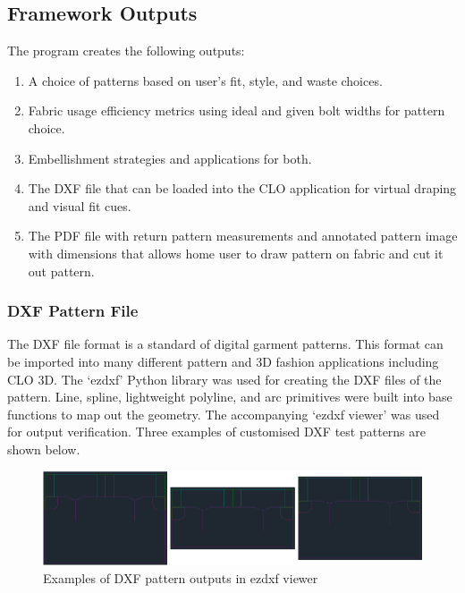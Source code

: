 
\subsection{Framework Outputs}
The program creates the following outputs:
\begin{enumerate}
    \item A choice of patterns based on user's fit, style, and waste choices.
    \item Fabric usage efficiency metrics using ideal and given bolt widths for pattern choice.
    \item Embellishment strategies and applications for both.
    \item The DXF file that can be loaded into the CLO application for virtual draping and visual fit cues.
    \item The PDF file with return pattern measurements and annotated pattern image with dimensions that allows home user to draw pattern on fabric and cut it out pattern.
\end{enumerate}

\subsubsection{DXF Pattern File}
The DXF file format is a standard of digital garment patterns. This format can be imported into many different pattern and 3D fashion applications including CLO 3D. The ‘ezdxf’ Python library was used for creating the DXF files of the pattern. Line, spline, lightweight polyline, and arc primitives were built into base functions to map out the geometry. The accompanying ‘ezdxf viewer’ was used for output verification. Three examples of customised DXF test patterns are shown below.

\begin{figure} [H] %
    \centering %
    \includegraphics[width = \textwidth]{Images/example dxfs.png} %
    \caption{Examples of DXF pattern outputs in ezdxf viewer}
\end{figure}


